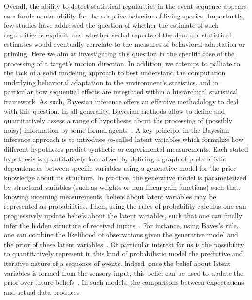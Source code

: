 \documentclass[12pt,english]{article}%
\newcommand{\citep}[1]{\parencite{#1}}
\begin{document}
Overall, the ability to detect
statistical regularities in the event sequence appears as a fundamental ability
for the adaptive behavior of living species.
Importantly, few studies have addressed the question of whether
the estimate of such regularities is explicit,
and whether verbal reports of the dynamic statistical
estimates would eventually correlate to the measures of behavioral adaptation or priming.
Here we aim at investigating this question
in the specific case of the  processing of a target's motion direction.
In addition, we attempt to palliate to the lack of a solid modeling approach
to best understand the computation underlying behavioral adaptation to the environment's statistics,
and in particular how sequential effects are integrated
within a hierarchical statistical framework.
As such, Bayesian inference offers an effective methodology
to deal with this question.
In all generality, Bayesian methods allow to define and quantitatively assess
a range of hypotheses about the processing of (possibly noisy) information by some formal agents~\citep{Deneve1999, Diaconescu2014, Daunizeau10a}.
A key principle in the Bayesian inference approach is
to introduce so-called latent variables 
which formalize how different hypotheses predict synthetic or experimental measurements.
Each stated hypothesis is quantitatively formalized
by defining a graph of probabilistic dependencies between specific variables
using a generative model for the prior knowledge about its structure.
In practice, the generative model is parameterized by structural variables
(such as weights or non-linear gain functions)
such that, knowing incoming measurements, beliefs about latent variables
may be represented as probabilities.
Then, using the rules of probability calculus
one can progressively update beliefs about the latent variables,
such that one can finally infer the hidden structure of received inputs~\citep{Hoyer2003, Ma2014}.
For instance, using Bayes's rule, one can combine
the likelihood of observations given the generative model and
the prior of these latent variables~\citep{Janes2014}.
Of particular interest for us is the possibility to
quantitatively represent in this kind of probabilistic model
the predictive and iterative nature of a sequence of events.
Indeed, once the belief about latent variables
is formed from the sensory input,
this belief can be used to update
the prior over future beliefs~\citep{Montagnini2007}.
In such models, the comparisons between expectations and actual data produces
\end{document}
